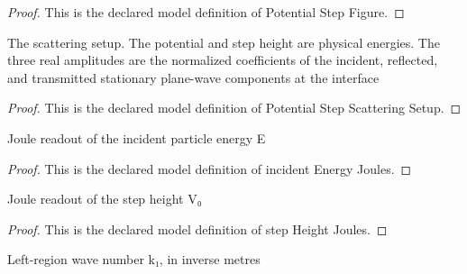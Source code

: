 \begin{proof}
  This is the declared model definition of Potential Step Figure.
\end{proof}
\begin{definition}
  \label{def:physics:phyx-mini-0544:phyxminiproblems-problemphyxmini0544-potentialstepscatteringsetup}
  The scattering setup. The potential and step height are physical energies. The three real amplitudes are the normalized coefficients of the incident, reflected, and transmitted stationary plane-wave components at the interface
\end{definition}
\begin{proof}
  This is the declared model definition of Potential Step Scattering Setup.
\end{proof}
\begin{definition}
  \label{def:physics:phyx-mini-0544:phyxminiproblems-problemphyxmini0544-incidentenergyjoules}
  Joule readout of the incident particle energy E
\end{definition}
\begin{proof}
  This is the declared model definition of incident Energy Joules.
\end{proof}
\begin{definition}
  \label{def:physics:phyx-mini-0544:phyxminiproblems-problemphyxmini0544-stepheightjoules}
  Joule readout of the step height V₀
\end{definition}
\begin{proof}
  This is the declared model definition of step Height Joules.
\end{proof}
\begin{definition}
  \label{def:physics:phyx-mini-0544:phyxminiproblems-problemphyxmini0544-incidentwavenumbersi}
  Left-region wave number k₁, in inverse metres
\end{definition}
